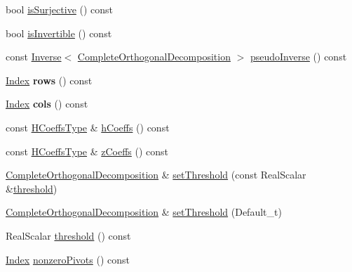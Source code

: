 \begin{DoxyCompactItemize}
\item 
bool \hyperlink{group___q_r___module_a53dd287d3e1bbc548595d63880fd51bf}{is\+Surjective} () const
\item 
bool \hyperlink{group___q_r___module_a7c4f24f868295349a3bb99e5f217b069}{is\+Invertible} () const
\item 
const \hyperlink{class_eigen_1_1_inverse}{Inverse}$<$ \hyperlink{group___q_r___module_class_eigen_1_1_complete_orthogonal_decomposition}{Complete\+Orthogonal\+Decomposition} $>$ \hyperlink{group___q_r___module_a3c89639299720ce089435d26d6822d6f}{pseudo\+Inverse} () const
\item 
\mbox{\label{group___q_r___module_ae49c60b9b4d7f74dc79a94bf20a14142}} 
\hyperlink{namespace_eigen_a62e77e0933482dafde8fe197d9a2cfde}{Index} {\bfseries rows} () const
\item 
\mbox{\label{group___q_r___module_a41e9ee4b8bd05c9021fd066169e1d76c}} 
\hyperlink{namespace_eigen_a62e77e0933482dafde8fe197d9a2cfde}{Index} {\bfseries cols} () const
\item 
const \hyperlink{class_eigen_1_1internal_1_1_tensor_lazy_evaluator_writable}{H\+Coeffs\+Type} \& \hyperlink{group___q_r___module_ad25a868ecd499d6dda0119e4d3659504}{h\+Coeffs} () const
\item 
const \hyperlink{class_eigen_1_1internal_1_1_tensor_lazy_evaluator_writable}{H\+Coeffs\+Type} \& \hyperlink{group___q_r___module_a0b28c24992d313d4b04d109dcc7e5220}{z\+Coeffs} () const
\item 
\hyperlink{group___q_r___module_class_eigen_1_1_complete_orthogonal_decomposition}{Complete\+Orthogonal\+Decomposition} \& \hyperlink{group___q_r___module_aa9c9f7cbde9d58ca5552381b70ad8d82}{set\+Threshold} (const Real\+Scalar \&\hyperlink{group___q_r___module_a3909f07268496c0f08f1b57331d91075}{threshold})
\item 
\hyperlink{group___q_r___module_class_eigen_1_1_complete_orthogonal_decomposition}{Complete\+Orthogonal\+Decomposition} \& \hyperlink{group___q_r___module_a27c8da71874be7a64d6723bd0cae9f4f}{set\+Threshold} (Default\+\_\+t)
\item 
Real\+Scalar \hyperlink{group___q_r___module_a3909f07268496c0f08f1b57331d91075}{threshold} () const
\item 
\hyperlink{namespace_eigen_a62e77e0933482dafde8fe197d9a2cfde}{Index} \hyperlink{group___q_r___module_af9d7a5bdbc16a4a0bf7394ef0dd208da}{nonzero\+Pivots} () const

\end{DoxyCompactItemize}
